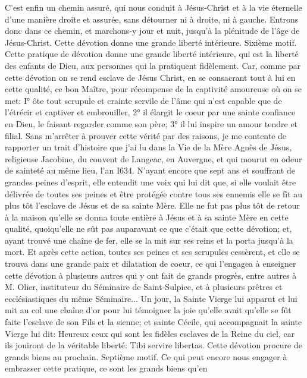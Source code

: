 C'est enfin un chemin assuré, qui nous conduit à Jésus-Christ et à la vie éternelle d'une manière droite et assurée,
sans détourner ni à droite, ni à gauche. Entrons donc dans ce chemin, et marchons-y jour et nuit, jusqu'à la
plénitude de l'âge de Jésus-Christ.
Cette dévotion donne une grande liberté intérieure.
 Sixième motif. Cette pratique de dévotion donne une grande liberté intérieure, qui est la liberté des enfants
de Dieu, aux personnes qui la pratiquent fidèlement. Car, comme par cette dévotion on se rend esclave de Jésus Christ, en se consacrant tout à lui en cette qualité, ce bon Maître, pour récompense de la captivité amoureuse où
on se met: I° ôte tout scrupule et crainte servile de l'âme qui n'est capable que de l'étrécir et captiver et
embrouiller, 2° il élargit le coeur par une sainte confiance en Dieu, le faisant regarder comme son père; 3° il lui
inspire un amour tendre et filial.
 Sans m'arrêter à prouver cette vérité par des raisons, je me contente de rapporter un trait d'histoire que j'ai lu
dans la Vie de la Mère Agnès de Jésus, religieuse Jacobine, du couvent de Langeac, en Auvergne, et qui mourut
en odeur de sainteté au même lieu, l'an I634. N'ayant encore que sept ans et souffrant de grandes peines d'esprit,
elle entendit une voix qui lui dit que, si elle voulait être délivrée de toutes ses peines et être protégée contre tous
ses ennemis elle se fît au plus tôt l'esclave de Jésus et de sa sainte Mère. Elle ne fut pas plus tôt de retour à la
maison qu'elle se donna toute entière à Jésus et à sa sainte Mère en cette qualité, quoiqu'elle ne sût pas
auparavant ce que c'était que cette dévotion; et, ayant trouvé une chaîne de fer, elle se la mit sur ses reins et la
porta jusqu'à la mort. Et après cette action, toutes ses peines et ses scrupules cessèrent, et elle se trouva dans
une grande paix et dilatation de coeur, ce qui l'engagea à enseigner cette dévotion à plusieurs autres qui y ont fait
de grands progrès, entre autres à M. Olier, instituteur du Séminaire de Saint-Sulpice, et à plusieurs prêtres et
ecclésiastiques du même Séminaire... Un jour, la Sainte Vierge lui apparut et lui mit au col une chaîne d'or pour lui
témoigner la joie qu'elle avait qu'elle se fût faite l'esclave de son Fils et la sienne; et sainte Cécile, qui
accompagnait la sainte Vierge lui dit: Heureux ceux qui sont les fidèles esclaves de la Reine du ciel, car ils jouiront
de la véritable liberté: Tibi servire libertas.
Cette dévotion procure de grands biens au prochain.
 Septième motif. Ce qui peut encore nous engager à embrasser cette pratique, ce sont les grands biens qu'en
